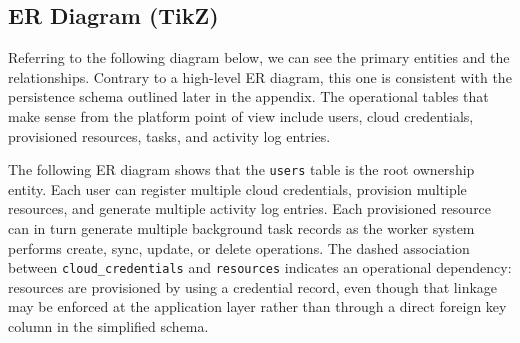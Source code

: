 \subsection{ER Diagram (TikZ)}
Referring to the following diagram below, we can see the primary entities and the relationships. Contrary to a high-level ER diagram, this one is consistent with the persistence schema outlined later in the appendix. The operational tables that make sense from the platform point of view include users, cloud credentials, provisioned resources, tasks, and activity log entries.


The following ER diagram shows that the \texttt{users} table is the root ownership entity. Each user can register multiple cloud credentials, provision multiple resources, and generate multiple activity log entries. Each provisioned resource can in turn generate multiple background task records as the worker system performs create, sync, update, or delete operations. The dashed association between \texttt{cloud\_credentials} and \texttt{resources} indicates an operational dependency: resources are provisioned by using a credential record, even though that linkage may be enforced at the application layer rather than through a direct foreign key column in the simplified schema.

